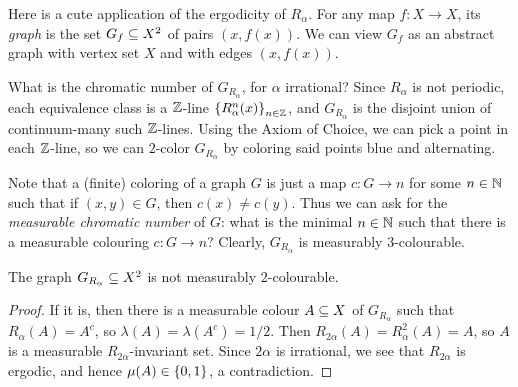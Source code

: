 \documentclass[reqno, twoside]{article}
\begin{document}
    Here is a cute application of the ergodicity of $R_\alpha$. For any map $f:X\to X$, its \textit{graph} is the set $G_f\subseteq X^2$ of pairs $(x,f(x))$. We can view $G_f$ as an abstract graph with vertex set $X$ and with edges $(x,f(x))$.

    What is the chromatic number of $G_{R_\alpha}$, for $\alpha$ irrational? Since $R_\alpha$ is not periodic, each equivalence class is a $\mathbb{Z}$-line $\left\{R_\alpha^n(x)\right\}_{n\in\mathbb{Z}}$, and $G_{R_\alpha}$ is the disjoint union of continuum-many such $\mathbb{Z}$-lines. Using the Axiom of Choice, we can pick a point in each $\mathbb{Z}$-line, so we can $2$-color $G_{R_\alpha}$ by coloring said points blue and alternating.

    Note that a (finite) coloring of a graph $G$ is just a map $c:G\to n$ for some $n\in\mathbb{N}$ such that if $(x,y)\in G$, then $c(x)\neq c(y)$. Thus we can ask for the \textit{measurable chromatic number} of $G$: what is the minimal $n\in\mathbb{N}$ such that there is a measurable colouring $c:G\to n$? Clearly, $G_{R_\alpha}$ is measurably $3$-colourable.

    \begin{corollary}
        The graph $G_{R_\alpha}\subseteq X^2$ is not measurably $2$-colourable.
    \end{corollary}
    \begin{proof}
        If it is, then there is a measurable colour $A\subseteq X$ of $G_{R_\alpha}$ such that $R_\alpha(A)=A^c$, so $\lambda(A)=\lambda(A^c)=1/2$. Then $R_{2\alpha}(A)=R_\alpha^2(A)=A$, so $A$ is a measurable $R_{2\alpha}$-invariant set. Since $2\alpha$ is irrational, we see that $R_{2\alpha}$ is ergodic, and hence $\mu(A)\in\left\{0,1\right\}$, a contradiction.
    \end{proof}
\end{document}
